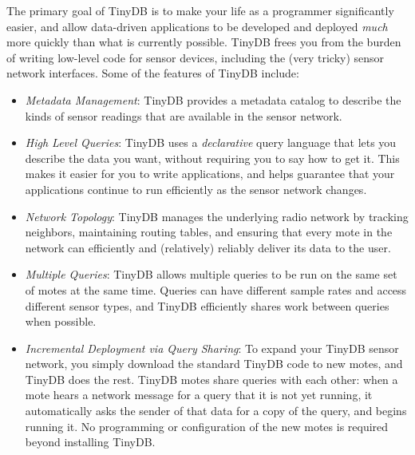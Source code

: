 \documentclass[11pt]{article}
\begin{document}
The primary goal of TinyDB is to make your life as a programmer
significantly easier, and allow data-driven applications to be
developed and deployed {\em much} more quickly than what is currently
possible.  TinyDB frees you from the burden of writing low-level code
for sensor devices, including the (very tricky) sensor network
interfaces.  Some of the features of TinyDB include:

\begin{itemize}
\item {\it Metadata Management}: TinyDB provides a
  metadata catalog to describe the kinds of sensor readings that are
  available in the sensor network.
\item {\it High Level Queries}: TinyDB uses a {\em
    declarative} query language that lets you
  describe the data you want, without requiring you to say how to get
  it.  This makes it easier for you to write applications, and helps
  guarantee that your applications continue to run efficiently as the
  sensor network changes.
\item {\it Network Topology}: TinyDB
  manages the underlying radio network by tracking
  neighbors, maintaining routing
  tables, and ensuring that every mote in the network can
  efficiently and (relatively) reliably deliver its data to the user.
\item {\it Multiple Queries}: TinyDB allows multiple
  queries to be run on the same set of motes at the same
  time.  Queries can have different sample rates and
  access different sensor types, and
  TinyDB efficiently shares work between queries when
  possible.
\item {\it Incremental Deployment via Query Sharing}: To expand your
  TinyDB sensor network, you
  simply download the standard TinyDB
  code to new motes, and TinyDB does the
  rest.  TinyDB motes share queries with
  each other: when a mote hears a network message for a
  query that it is not yet running, it automatically asks the sender
  of that data for a copy of the query, and begins running it.  No
  programming or configuration of the new motes is
  required beyond installing TinyDB.
\end{itemize}
\end{document}
